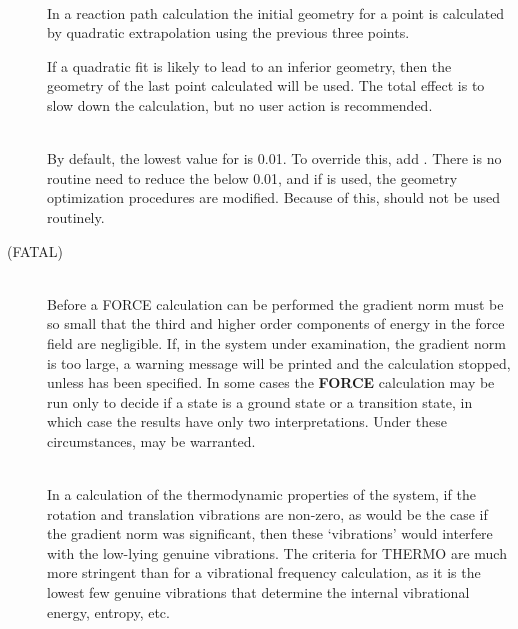 \begin{description}
\item[]~\\
In a reaction path calculation the initial geometry for a point is calculated
by quadratic extrapolation using the previous three points.

If a quadratic fit is likely to lead to an inferior geometry,  then the 
geometry  of  the  last  point  calculated will be used.  The total effect  is 
to  slow  down  the  calculation,  but  no  user  action  is recommended.

\item[]~\\
By default, the lowest value for  is 0.01.  To override this, add
.  There is no routine need to reduce the  below 0.01, and
if  is used, the geometry optimization procedures are modified.
Because of this,  should not be used routinely.

\item[ (FATAL)]~\\
Before a FORCE calculation can be performed the gradient norm  must be  so
small that the third and higher order components of energy in the force field
are negligible.  If, in the system  under  examination,  the gradient  norm 
is  too  large,  a warning message will be printed and the calculation
stopped,  unless  has been specified.  In  some  cases  the  {\bf
FORCE} calculation  may be run only to decide if a state is a ground state or a
transition  state,  in  which   case   the   results   have   only   two
interpretations.  Under these circumstances,  may be warranted.

\item[]~\\
In a calculation of the thermodynamic properties of the system,  if the 
rotation  and  translation vibrations are non-zero, as would be the case if the
gradient norm was significant, then these `vibrations' would interfere  with 
the  low-lying  genuine  vibrations.   The criteria for THERMO  are  much 
more  stringent  than  for  a  vibrational  frequency calculation,  as  it is
the lowest few genuine vibrations that determine the internal vibrational
energy, entropy, etc.


\end{description}
